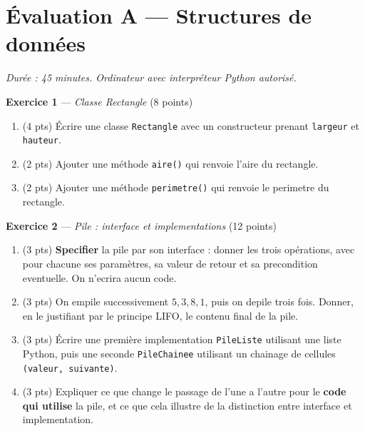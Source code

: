 \section*{Évaluation A --- Structures de données}
\textit{Durée : 45 minutes. Ordinateur avec interpréteur Python autorisé.}


\bigskip

\textbf{Exercice 1} --- \textit{Classe Rectangle} \hfill (8 points)

\begin{enumerate}
  \item (4 pts) Écrire une classe \lstinline{Rectangle} avec un constructeur prenant \lstinline{largeur} et \lstinline{hauteur}.
  \item (2 pts) Ajouter une méthode \lstinline{aire()} qui renvoie l'aire du rectangle.
  \item (2 pts) Ajouter une méthode \lstinline{perimetre()} qui renvoie le perimetre du rectangle.
\end{enumerate}


\bigskip

\textbf{Exercice 2} --- \textit{Pile : interface et implementations} \hfill (12 points)

\begin{enumerate}
  \item (3 pts) \textbf{Specifier} la pile par son interface : donner les trois opérations,
  avec pour chacune ses paramètres, sa valeur de retour et sa precondition eventuelle. On
  n'ecrira aucun code.
  \item (3 pts) On empile successivement $5, 3, 8, 1$, puis on depile trois fois. Donner, en
  le justifiant par le principe LIFO, le contenu final de la pile.
  \item (3 pts) Écrire une première implementation \lstinline{PileListe} utilisant une liste
  Python, puis une seconde \lstinline{PileChainee} utilisant un chainage de cellules
  \lstinline{(valeur, suivante)}.
  \item (3 pts) Expliquer ce que change le passage de l'une a l'autre pour le \textbf{code
  qui utilise} la pile, et ce que cela illustre de la distinction entre interface et
  implementation.
\end{enumerate}


